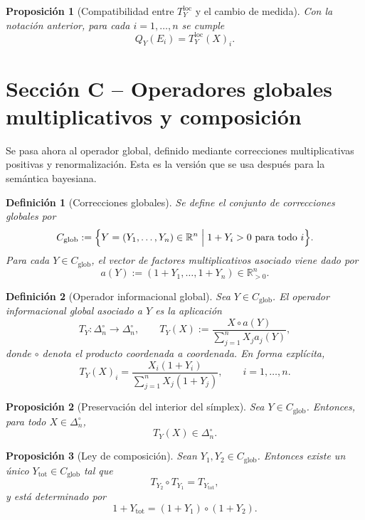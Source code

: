 ﻿\documentclass[12pt]{article}
\newtheorem{definicion}{Definición}[section]
\newtheorem{proposicion}{Proposición}[section]
\begin{document}
\begin{proposicion}[Compatibilidad entre $T_Y^{\mathrm{loc}}$ y el cambio de medida]\label{prop:compatibilidadCambioMedida}
Con la notación anterior, para cada $i=1,\dots,n$ se cumple
\[
Q_Y(E_i)=T_Y^{\mathrm{loc}}(X)_i.
\]
\end{proposicion}

\section{Sección C -- Operadores globales multiplicativos y composición}

Se pasa ahora al operador global, definido mediante correcciones multiplicativas positivas y renormalización. Esta es la versión que se usa después para la semántica bayesiana.

\begin{definicion}[Correcciones globales]\label{def:Cglob}
Se define el conjunto de \emph{correcciones globales} por
\[
C_{\mathrm{glob}}
:=
\Bigl\{
Y=(Y_1,\dots,Y_n)\in\mathbb{R}^n
\;\Big|\;
1+Y_i>0\ \text{para todo } i
\Bigr\}.
\]
Para cada $Y\in C_{\mathrm{glob}}$, el vector de factores multiplicativos asociado viene dado por
\[
a(Y):=(1+Y_1,\dots,1+Y_n)\in\mathbb{R}_{>0}^n.
\]
\end{definicion}

\begin{definicion}[Operador informacional global]\label{def:Tglobal}
Sea $Y\in C_{\mathrm{glob}}$. El \emph{operador informacional global} asociado a $Y$ es la aplicación
\[
T_Y:\Delta_n^\circ\to\Delta_n^\circ,\qquad
T_Y(X):=\frac{X\circ a(Y)}{\sum_{j=1}^n X_j a_j(Y)},
\]
donde $\circ$ denota el producto coordenada a coordenada. En forma explícita,
\[
T_Y(X)_i
=
\frac{X_i(1+Y_i)}{\sum_{j=1}^n X_j(1+Y_j)},
\qquad i=1,\dots,n.
\]
\end{definicion}

\begin{proposicion}[Preservación del interior del símplex]\label{prop:interiorGlobal}
Sea $Y\in C_{\mathrm{glob}}$. Entonces, para todo $X\in\Delta_n^\circ$,
\[
T_Y(X)\in\Delta_n^\circ.
\]
\end{proposicion}

\begin{proposicion}[Ley de composición]\label{prop:composicionGlobal}
Sean $Y_1,Y_2\in C_{\mathrm{glob}}$. Entonces existe un único $Y_{\mathrm{tot}}\in C_{\mathrm{glob}}$ tal que
\[
T_{Y_2}\circ T_{Y_1}=T_{Y_{\mathrm{tot}}},
\]
y está determinado por
\[
1+Y_{\mathrm{tot}}
=
(1+Y_1)\circ(1+Y_2).
\]
\end{proposicion}
\end{document}
